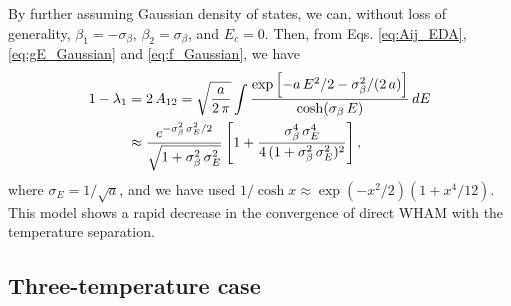 \documentclass{gMOS2e}
\begin{document}
By further assuming Gaussian density of states,
we can, without loss of generality,
$\beta_1 = -\sigma_\beta$,
$\beta_2 = \sigma_\beta$,
and $E_c = 0$.
%
Then, from
Eqs. \eqref{eq:Aij_EDA},
\eqref{eq:gE_Gaussian}
and \eqref{eq:f_Gaussian},
we have
%
\begin{align}
1 - \lambda_1
&= 2 \, A_{12}
=
\sqrt \frac{ a } { 2 \, \pi }
\int
\frac
{
  \exp\left[
    -a \, E^2/2
    -\sigma_\beta^2 / (2 \, a)
  \right]
}
{ \cosh( \sigma_\beta \, E ) }
\, dE
\notag \\
%
&\approx\frac{ e^{-\sigma_\beta^2 \, \sigma_E^2/2} }
{ \sqrt{ 1 + \sigma_\beta^2 \, \sigma_E^2 } }
\left[
  1 + \frac{ \sigma_\beta^4 \, \sigma_E^4 }
  {4\,(1 + \sigma_\beta^2 \, \sigma_E^2)^2 }
\right],
\label{eq:lambda1_twoT}
\end{align}
%
where
$\sigma_E = 1/\sqrt{a}$,
%
and we have used
$1/\cosh x \approx \exp(-x^2/2)(1 + x^4/12)$.
%
This model shows
a rapid decrease in
the convergence of direct WHAM
with the temperature separation.



\subsection{Three-temperature case}
\end{document}
